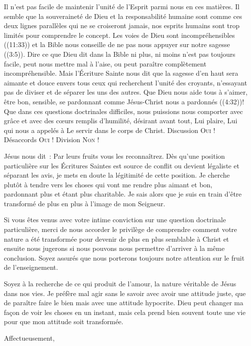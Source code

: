 Il n'est pas facile de maintenir l'unité de l'Esprit parmi nous en ces matières.
 Il semble que la souveraineté de Dieu et la responsabilité humaine
 sont comme ces deux lignes parallèles qui ne se croiseront jamais,
 nos esprits humains sont trop limités pour comprendre le concept.
 Les voies de Dieu sont \og incompréhensibles \fg{} ((11:33))
 et la Bible nous conseille de \og ne pas nous appuyer sur notre sagesse \fg{} ((3:5)).
 Dire ce que Dieu dit dans la Bible \ocadr ni plus, ni moins \fcadr{} n'est pas toujours facile,
 peut nous mettre mal à l'aise, ou peut paraître complètement incompréhensible.
 Mais l'Écriture Sainte nous dit que la sagesse d'en haut sera aimante
 et douce envers tous ceux qui recherchent l'unité des croyants,
 n'essayant pas de diviser et de séparer les uns des autres.
 Que Dieu nous aide tous à s'aimer, être bon, sensible, se pardonnant comme Jésus-Christ
 nous a pardonnés ((4:32))!
 Que dans ces questions doctrinales difficiles, nous puissions nous comporter avec grâce
 et avec des cœurs remplis d'humilité, désirant avant tout, Lui plaire,
 Lui qui nous a appelés à Le servir dans le corps de Christ.
 Discussion \ocadr \textsc{Oui} !
 Désaccords \ocadr \textsc{Oui} !
 Division \ocadr \textsc{Non} !

Jésus nous dit~: \og Par leurs fruits vous les reconnaîtrez. \fg{}
 Dès qu'une position particulière sur les Écritures Saintes est source de conflit
 ou devient légaliste et séparant les avis, je mets en doute la légitimité de cette position.
 Je cherche plutôt à tendre vers les choses qui vont me rendre plus aimant et bon,
 pardonnant plus et étant plus charitable. Je sais alors que je suis en train
 d'être transformé de plus en plus à l'image de mon Seigneur.

Si vous êtes venus avec votre intime conviction sur une question doctrinale particulière,
 merci de nous accorder le privilège de comprendre comment votre nature a été  transformée
 pour devenir de plus en plus semblable à Christ et ensuite nous jugerons
 si nous pouvons nous permettre d'arriver à la même conclusion.
 Soyez assurés que nous porterons toujours notre attention sur le fruit de l'enseignement.

Soyez à la recherche de ce qui produit de l'amour, la nature véritable de Jésus dans nos vies.
 Je préfère mal agir sans le savoir avec avoir une attitude juste,
 que de paraître faire le bien mais avec une attitude hypocrite.
 Dieu peut changer ma façon de voir les choses en un instant,
 mais cela prend bien souvent toute une vie pour que mon attitude soit transformée.

Affectueusement,

\signature{Chuck Smith}

